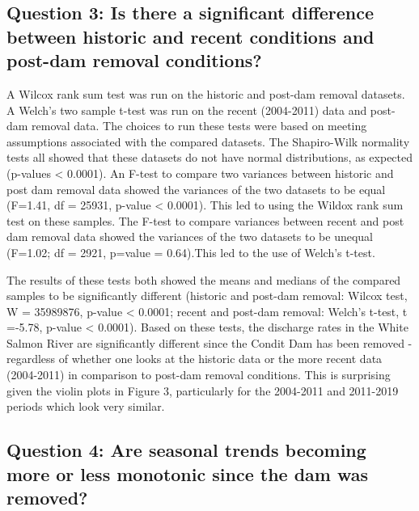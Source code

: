 \documentclass[
  12pt,
]{article}
\begin{document}
\hypertarget{question-3-is-there-a-significant-difference-between-historic-and-recent-conditions-and-post-dam-removal-conditions}{%
\subsection{Question 3: Is there a significant difference between
historic and recent conditions and post-dam removal
conditions?}\label{question-3-is-there-a-significant-difference-between-historic-and-recent-conditions-and-post-dam-removal-conditions}}

A Wilcox rank sum test was run on the historic and post-dam removal
datasets. A Welch's two sample t-test was run on the recent (2004-2011)
data and post-dam removal data. The choices to run these tests were
based on meeting assumptions associated with the compared datasets. The
Shapiro-Wilk normality tests all showed that these datasets do not have
normal distributions, as expected (p-values \textless{} 0.0001). An
F-test to compare two variances between historic and post dam removal
data showed the variances of the two datasets to be equal (F=1.41, df =
25931, p-value \textless{} 0.0001). This led to using the Wildox rank
sum test on these samples. The F-test to compare variances between
recent and post dam removal data showed the variances of the two
datasets to be unequal (F=1.02; df = 2921, p=value = 0.64).This led to
the use of Welch's t-test.

The results of these tests both showed the means and medians of the
compared samples to be significantly different (historic and post-dam
removal: Wilcox test, W = 35989876, p-value \textless{} 0.0001; recent
and post-dam removal: Welch's t-test, t =-5.78, p-value \textless{}
0.0001). Based on these tests, the discharge rates in the White Salmon
River are significantly different since the Condit Dam has been removed
- regardless of whether one looks at the historic data or the more
recent data (2004-2011) in comparison to post-dam removal conditions.
This is surprising given the violin plots in Figure 3, particularly for
the 2004-2011 and 2011-2019 periods which look very similar.

\hypertarget{question-4-are-seasonal-trends-becoming-more-or-less-monotonic-since-the-dam-was-removed}{%
\subsection{Question 4: Are seasonal trends becoming more or less
monotonic since the dam was
removed?}\label{question-4-are-seasonal-trends-becoming-more-or-less-monotonic-since-the-dam-was-removed}}
\end{document}
